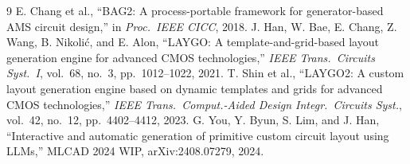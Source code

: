 \documentclass[conference]{IEEEtran}
\begin{document}
\begin{thebibliography}{9}
 E. Chang et al., ``BAG2: A process-portable framework for generator-based AMS circuit design,'' in \emph{Proc.\ IEEE CICC}, 2018.
 J. Han, W. Bae, E. Chang, Z. Wang, B. Nikoli\'c, and E. Alon, ``LAYGO: A template-and-grid-based layout generation engine for advanced CMOS technologies,'' \emph{IEEE Trans.\ Circuits Syst.\ I}, vol.~68, no.~3, pp.~1012--1022, 2021.
 T. Shin et al., ``LAYGO2: A custom layout generation engine based on dynamic templates and grids for advanced CMOS technologies,'' \emph{IEEE Trans.\ Comput.-Aided Design Integr.\ Circuits Syst.}, vol.~42, no.~12, pp.~4402--4412, 2023.
 G. You, Y. Byun, S. Lim, and J. Han, ``Interactive and automatic generation of primitive custom circuit layout using LLMs,'' MLCAD 2024 WIP, arXiv:2408.07279, 2024.
\end{thebibliography}
\end{document}
